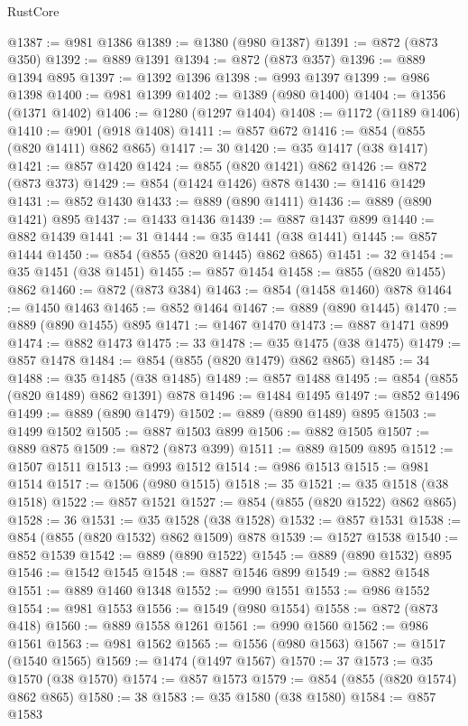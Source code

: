 \begin{lexlean}{RustCore}
\begin{coremodule}
@1387 := @981 @1386
@1389 := @1380 (@980 @1387)
@1391 := @872 (@873 @350)
@1392 := @889 @1391
@1394 := @872 (@873 @357)
@1396 := @889 @1394 @895
@1397 := @1392 @1396
@1398 := @993 @1397
@1399 := @986 @1398
@1400 := @981 @1399
@1402 := @1389 (@980 @1400)
@1404 := @1356 (@1371 @1402)
@1406 := @1280 (@1297 @1404)
@1408 := @1172 (@1189 @1406)
@1410 := @901 (@918 @1408)
@1411 := @857 @672
@1416 := @854 (@855 (@820 @1411) @862 @865)
@1417 := 30
@1420 := @35 @1417 (@38 @1417)
@1421 := @857 @1420
@1424 := @855 (@820 @1421) @862
@1426 := @872 (@873 @373)
@1429 := @854 (@1424 @1426) @878
@1430 := @1416 @1429
@1431 := @852 @1430
@1433 := @889 (@890 @1411)
@1436 := @889 (@890 @1421) @895
@1437 := @1433 @1436
@1439 := @887 @1437 @899
@1440 := @882 @1439
@1441 := 31
@1444 := @35 @1441 (@38 @1441)
@1445 := @857 @1444
@1450 := @854 (@855 (@820 @1445) @862 @865)
@1451 := 32
@1454 := @35 @1451 (@38 @1451)
@1455 := @857 @1454
@1458 := @855 (@820 @1455) @862
@1460 := @872 (@873 @384)
@1463 := @854 (@1458 @1460) @878
@1464 := @1450 @1463
@1465 := @852 @1464
@1467 := @889 (@890 @1445)
@1470 := @889 (@890 @1455) @895
@1471 := @1467 @1470
@1473 := @887 @1471 @899
@1474 := @882 @1473
@1475 := 33
@1478 := @35 @1475 (@38 @1475)
@1479 := @857 @1478
@1484 := @854 (@855 (@820 @1479) @862 @865)
@1485 := 34
@1488 := @35 @1485 (@38 @1485)
@1489 := @857 @1488
@1495 := @854 (@855 (@820 @1489) @862 @1391) @878
@1496 := @1484 @1495
@1497 := @852 @1496
@1499 := @889 (@890 @1479)
@1502 := @889 (@890 @1489) @895
@1503 := @1499 @1502
@1505 := @887 @1503 @899
@1506 := @882 @1505
@1507 := @889 @875
@1509 := @872 (@873 @399)
@1511 := @889 @1509 @895
@1512 := @1507 @1511
@1513 := @993 @1512
@1514 := @986 @1513
@1515 := @981 @1514
@1517 := @1506 (@980 @1515)
@1518 := 35
@1521 := @35 @1518 (@38 @1518)
@1522 := @857 @1521
@1527 := @854 (@855 (@820 @1522) @862 @865)
@1528 := 36
@1531 := @35 @1528 (@38 @1528)
@1532 := @857 @1531
@1538 := @854 (@855 (@820 @1532) @862 @1509) @878
@1539 := @1527 @1538
@1540 := @852 @1539
@1542 := @889 (@890 @1522)
@1545 := @889 (@890 @1532) @895
@1546 := @1542 @1545
@1548 := @887 @1546 @899
@1549 := @882 @1548
@1551 := @889 @1460 @1348
@1552 := @990 @1551
@1553 := @986 @1552
@1554 := @981 @1553
@1556 := @1549 (@980 @1554)
@1558 := @872 (@873 @418)
@1560 := @889 @1558 @1261
@1561 := @990 @1560
@1562 := @986 @1561
@1563 := @981 @1562
@1565 := @1556 (@980 @1563)
@1567 := @1517 (@1540 @1565)
@1569 := @1474 (@1497 @1567)
@1570 := 37
@1573 := @35 @1570 (@38 @1570)
@1574 := @857 @1573
@1579 := @854 (@855 (@820 @1574) @862 @865)
@1580 := 38
@1583 := @35 @1580 (@38 @1580)
@1584 := @857 @1583

\end{coremodule}
\end{lexlean}
